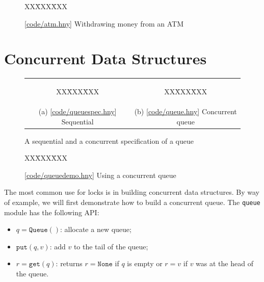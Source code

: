\documentclass{report}
\newcommand{\harmonysource}[1]{
\begin{tabbing}
XX\=XXX\=XXX\kill
    
\end{tabbing}
}
\newcommand{\harmonylink}[1]{%
[\href{https://harmony.cs.cornell.edu/#1}{\underline{#1}}]%
}
\newenvironment{code}{
\tcolorbox
}{
\endtcolorbox
}
\begin{document}
\begin{figure}
\begin{code}
\harmonysource{atm}
\end{code}
\caption{\harmonylink{code/atm.hny} Withdrawing money from an ATM}
\label{fig:atm}
\end{figure}

\chapter{Concurrent Data Structures}
\label{ch:cds}

\begin{figure}[h]
\begin{center}
\begin{tabular}{cc}
\begin{tcolorbox}[width=0.41\linewidth]
\harmonysource{queuespec}
\end{tcolorbox}
&
\begin{tcolorbox}[width=0.52\linewidth]
\harmonysource{queue}
\end{tcolorbox}
\\
(a) \harmonylink{code/queuespec.hny} Sequential & (b) \harmonylink{code/queue.hny} Concurrent queue
\end{tabular}
\end{center}
\caption{A sequential and a concurrent specification of a queue}
\label{fig:queues}
\end{figure}

\begin{figure}
\begin{code}
\harmonysource{queuedemo}
\end{code}
\caption{\harmonylink{code/queuedemo.hny} Using a concurrent queue}
\label{fig:queuedemo}
\end{figure}

The most common use for locks is in building concurrent data structures.
By way of example, we will first demonstrate how to build a concurrent queue.
The \texttt{queue} module has the following API:
\begin{itemize}
\item $q = \mathtt{Queue}()$: allocate a new queue;
\item $\mathtt{put}(q, v)$: add $v$ to the tail of the queue;
\item $r = \mathtt{get}(q)$: returns $r = \mathtt{None}$
if $q$ is empty or $r = v$ if $v$ was at the head of the queue.
\end{itemize}
\end{document}
